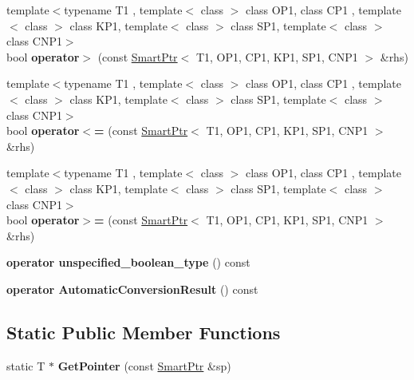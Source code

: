 \begin{DoxyCompactItemize}
\item 
\hypertarget{classLoki_1_1SmartPtr_a5bad2bb983dbb2ec39f036d77bdf035d}{}{\footnotesize template$<$typename T1 , template$<$ class $>$ class O\+P1, class C\+P1 , template$<$ class $>$ class K\+P1, template$<$ class $>$ class S\+P1, template$<$ class $>$ class C\+N\+P1$>$ }\\bool {\bfseries operator$>$} (const \hyperlink{classLoki_1_1SmartPtr}{Smart\+Ptr}$<$ T1, O\+P1, C\+P1, K\+P1, S\+P1, C\+N\+P1 $>$ \&rhs)\label{classLoki_1_1SmartPtr_a5bad2bb983dbb2ec39f036d77bdf035d}

\item 
\hypertarget{classLoki_1_1SmartPtr_a701a4268f6f87b06ee58c7a37914ceaa}{}{\footnotesize template$<$typename T1 , template$<$ class $>$ class O\+P1, class C\+P1 , template$<$ class $>$ class K\+P1, template$<$ class $>$ class S\+P1, template$<$ class $>$ class C\+N\+P1$>$ }\\bool {\bfseries operator$<$=} (const \hyperlink{classLoki_1_1SmartPtr}{Smart\+Ptr}$<$ T1, O\+P1, C\+P1, K\+P1, S\+P1, C\+N\+P1 $>$ \&rhs)\label{classLoki_1_1SmartPtr_a701a4268f6f87b06ee58c7a37914ceaa}

\item 
\hypertarget{classLoki_1_1SmartPtr_a24082ec8b2ca2ed1283930243ec52710}{}{\footnotesize template$<$typename T1 , template$<$ class $>$ class O\+P1, class C\+P1 , template$<$ class $>$ class K\+P1, template$<$ class $>$ class S\+P1, template$<$ class $>$ class C\+N\+P1$>$ }\\bool {\bfseries operator$>$=} (const \hyperlink{classLoki_1_1SmartPtr}{Smart\+Ptr}$<$ T1, O\+P1, C\+P1, K\+P1, S\+P1, C\+N\+P1 $>$ \&rhs)\label{classLoki_1_1SmartPtr_a24082ec8b2ca2ed1283930243ec52710}

\item 
\hypertarget{classLoki_1_1SmartPtr_ab07ea03a5dd34b47e53991b0633d9127}{}{\bfseries operator unspecified\+\_\+boolean\+\_\+type} () const \label{classLoki_1_1SmartPtr_ab07ea03a5dd34b47e53991b0633d9127}

\item 
\hypertarget{classLoki_1_1SmartPtr_a19a910e807477980145a3d07e85c3b8a}{}{\bfseries operator Automatic\+Conversion\+Result} () const \label{classLoki_1_1SmartPtr_a19a910e807477980145a3d07e85c3b8a}

\end{DoxyCompactItemize}
\subsection*{Static Public Member Functions}
\begin{DoxyCompactItemize}
\item 
\hypertarget{classLoki_1_1SmartPtr_afd0bd0f14a87cc43e6758296a6c3b29e}{}static T $\ast$ {\bfseries Get\+Pointer} (const \hyperlink{classLoki_1_1SmartPtr}{Smart\+Ptr} \&sp)\label{classLoki_1_1SmartPtr_afd0bd0f14a87cc43e6758296a6c3b29e}

\end{DoxyCompactItemize}
